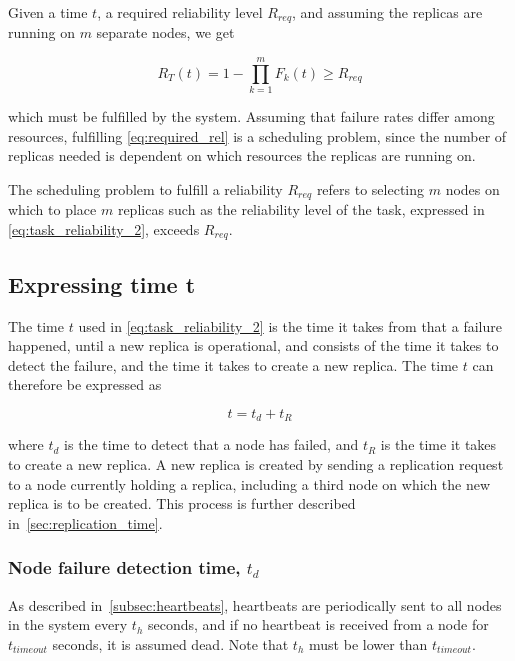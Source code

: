 \documentclass{cslthse-msc}
\begin{document}
Given a time $t$, a required reliability level $R_{req}$, and assuming the replicas are running on $m$ separate nodes, we get

\begin{equation} \label{eq:required_rel}
R_T(t) = 1 - \prod\limits_{k=1}^m F_{k}(t) \geq R_{req}
\end{equation}

which must be fulfilled by the system. Assuming that failure rates differ among resources, fulfilling \cref{eq:required_rel} is a scheduling problem, since the number of replicas needed is dependent on which resources the replicas are running on.

The scheduling problem to fulfill a reliability $R_{req}$ refers to selecting $m$ nodes on which to place $m$ replicas such as the reliability level of the task, expressed in \cref{eq:task_reliability_2}, exceeds $R_{req}$.

\subsection{Expressing time t} \label{sec:design_time_t}
The time $t$ used in \cref{eq:task_reliability_2} is the time it takes from that a failure happened, until a new replica is operational, and consists of the time it takes to detect the failure, and the time it takes to create a new replica. The time $t$ can therefore be expressed as 

\begin{equation} \label{eq:rep_time}
	t = t_d + t_R
\end{equation}

where $t_d$ is the time to detect that a node has failed, and $t_R$ is the time it takes to create a new replica. A new replica is created by sending a replication request to a node currently holding a replica, including a third node on which the new replica is to be created. This process is further described in~\cref{sec:replication_time}.

\subsubsection{Node failure detection time, $t_d$} \label{sec:node_failure_detection_time}
As described in~\cref{subsec:heartbeats}, heartbeats are periodically sent to all nodes in the system every $t_h$ seconds, and if no heartbeat is received from a node for $t_{timeout}$ seconds, it is assumed dead. Note that $t_h$ must be lower than $t_{timeout}$.
\end{document}
